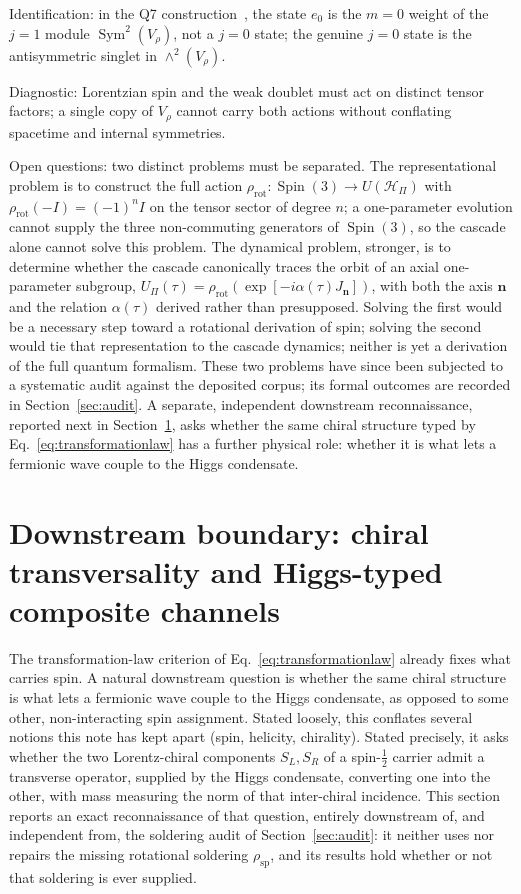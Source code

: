 \documentclass[11pt,a4paper]{article}
\begin{document}
Identification: in the Q7 construction~\cite{Beau2026q7}, the state $e_0$ is the $m = 0$ weight of the
$j = 1$ module $\operatorname{Sym}^2(V_\rho)$, not a $j = 0$ state; the genuine $j = 0$ state is the
antisymmetric singlet in $\wedge^2(V_\rho)$.

Diagnostic: Lorentzian spin and the weak doublet must act on distinct tensor factors; a single copy of
$V_\rho$ cannot carry both actions without conflating spacetime and internal symmetries.

Open questions: two distinct problems must be separated.
The representational problem is to construct the full action
$\rho_{\mathrm{rot}} \colon \operatorname{Spin}(3) \to U(\mathcal{H}_\Pi)$ with
$\rho_{\mathrm{rot}}(-I) = (-1)^n I$ on the tensor sector of degree $n$; a one-parameter evolution cannot
supply the three non-commuting generators of $\operatorname{Spin}(3)$, so the cascade alone cannot solve
this problem.
The dynamical problem, stronger, is to determine whether the cascade canonically traces the orbit of an
axial one-parameter subgroup,
$U_\Pi(\tau) = \rho_{\mathrm{rot}}\!\left(\exp[-i \alpha(\tau) J_{\mathbf{n}}]\right)$, with both the axis
$\mathbf{n}$ and the relation $\alpha(\tau)$ derived rather than presupposed.
Solving the first would be a necessary step toward a rotational derivation of spin; solving the second
would tie that representation to the cascade dynamics; neither is yet a derivation of the full quantum
formalism.
These two problems have since been subjected to a systematic audit against the deposited corpus; its
formal outcomes are recorded in Section~\ref{sec:audit}.
A separate, independent downstream reconnaissance, reported next in Section~\ref{sec:higgsboundary},
asks whether the same chiral structure typed by Eq.~\eqref{eq:transformationlaw} has a further
physical role: whether it is what lets a fermionic wave couple to the Higgs condensate.

\section[Downstream boundary: chiral transversality and composite channels]{Downstream boundary:
chiral transversality and Higgs-typed composite channels}
\label{sec:higgsboundary}

The transformation-law criterion of Eq.~\eqref{eq:transformationlaw} already fixes what carries spin.
A natural downstream question is whether the same chiral structure is what lets a fermionic wave
couple to the Higgs condensate, as opposed to some other, non-interacting spin assignment.
Stated loosely, this conflates several notions this note has kept apart (spin, helicity, chirality).
Stated precisely, it asks whether the two Lorentz-chiral components $S_L, S_R$ of a spin-$\tfrac12$
carrier admit a transverse operator, supplied by the Higgs condensate, converting one into the other,
with mass measuring the norm of that inter-chiral incidence.
This section reports an exact reconnaissance of that question, entirely downstream of, and
independent from, the soldering audit of Section~\ref{sec:audit}: it neither uses nor repairs the
missing rotational soldering $\rho_{\mathrm{sp}}$, and its results hold whether or not that soldering
is ever supplied.
\end{document}
